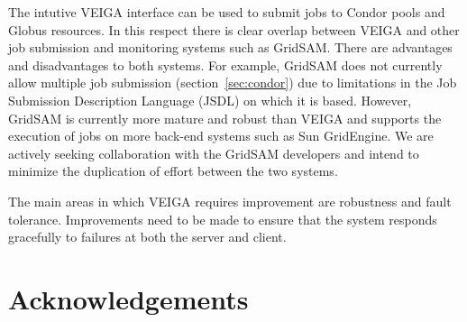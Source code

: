 \documentclass[a4paper]{article}
\begin{document}
\begin{multicols}{2}
The intutive VEIGA interface can be used to submit jobs to Condor pools and Globus resources.  In this respect there is clear overlap between VEIGA and other job submission and monitoring systems such as GridSAM.  There are advantages and disadvantages to both systems.  For example, GridSAM does not currently allow multiple job submission (section~\ref{sec:condor}) due to limitations in the Job Submission Description Language (JSDL) on which it is based.  However, GridSAM is currently more mature and robust than VEIGA and supports the execution of jobs on more back-end systems such as Sun GridEngine.  We are actively seeking collaboration with the GridSAM developers and intend to minimize the duplication of effort between the two systems.

The main areas in which VEIGA requires improvement are robustness and fault tolerance.  Improvements need to be made to ensure that the system responds gracefully to failures at both the server and client.

\section*{Acknowledgements}


\end{multicols}



\end{document}
